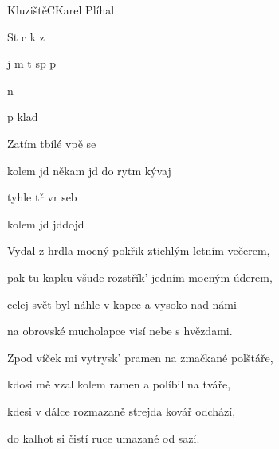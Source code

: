 \begin{song}{Kluziště}{C}{Karel Plíhal}

\begin{SBVerse}

St  c k  z 

   j m t sp p

   n

   p klad

\end{SBVerse}

\begin{SBChorus}

   Zatím tbílé vpě se

   kolem jd někam jd do rytm kývaj

   tyhle tř vr seb

   kolem jd jddojd

  \end{SBChorus}

\begin{SBVerse}

   Vydal z hrdla mocný pokřik ztichlým letním večerem,

   pak tu kapku všude rozstřík' jedním mocným úderem,

   celej svět byl náhle v kapce a vysoko nad námi

   na obrovské mucholapce visí nebe s hvězdami.

\end{SBVerse}

\begin{SBVerse}

   Zpod víček mi vytrysk' pramen na zmačkané polštáře,

   kdosi mě vzal kolem ramen a políbil na tváře,

   kdesi v dálce rozmazaně strejda kovář odchází,

   do kalhot si čistí ruce umazané od sazí.

 \end{SBVerse}

 \end{song} 
